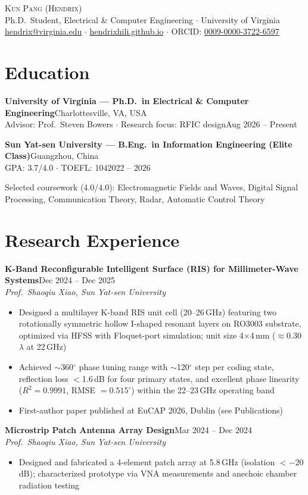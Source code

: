 \documentclass[letterpaper,10pt]{article}
\newcommand{\entry}[4]{%
  \textbf{#1}\hfill #2\\
  #3\hfill #4\par}
\newcommand{\gap}{\vspace{2pt}}
\begin{document}
\begin{center}
  {\LARGE\textsc{Kun Pang (Hendrix)}}\\[2pt]
  Ph.D.\ Student, Electrical \& Computer Engineering $\cdot$ University of Virginia\\[1pt]
  \href{mailto:hendrix@virginia.edu}{hendrix@virginia.edu} $\cdot$
  \href{https://hendrixhili.github.io}{hendrixhili.github.io} $\cdot$
  ORCID: \href{https://orcid.org/0009-0000-3722-6597}{0009-0000-3722-6597}
\end{center}
\vspace{-8pt}

\section{Education}
\entry{University of Virginia\textnormal{ --- Ph.D.\ in Electrical \& Computer Engineering}}{Charlottesville, VA, USA}
  {Advisor: Prof.\ Steven Bowers $\cdot$ Research focus: RFIC design}{Aug 2026 -- Present}
\gap
\entry{Sun Yat-sen University\textnormal{ --- B.Eng.\ in Information Engineering (Elite Class)}}{Guangzhou, China}
  {GPA: 3.7/4.0 $\cdot$ TOEFL: 104}{2022 -- 2026}
Selected coursework (4.0/4.0): Electromagnetic Fields and Waves, Digital Signal Processing, Communication Theory, Radar, Automatic Control Theory\par

\section{Research Experience}
\entry{K-Band Reconfigurable Intelligent Surface (RIS) for Millimeter-Wave Systems}{Dec 2024 -- Dec 2025}
  {\textit{Prof.\ Shaoqiu Xiao, Sun Yat-sen University}}{}
\begin{itemize}
  \item Designed a multilayer K-band RIS unit cell (20--26\,GHz) featuring two rotationally symmetric hollow I-shaped resonant layers on RO3003 substrate, optimized via HFSS with Floquet-port simulation; unit size 4$\times$4\,mm ($\approx$0.30$\lambda$ at 22\,GHz)
  \item Achieved $\sim$360$^\circ$ phase tuning range with $\sim$120$^\circ$ step per coding state, reflection loss $<$1.6\,dB for four primary states, and excellent phase linearity ($R^2 = 0.9991$, RMSE $= 0.515^\circ$) within the 22--23\,GHz operating band
  \item First-author paper published at EuCAP 2026, Dublin (see Publications)
\end{itemize}
\gap
\entry{Microstrip Patch Antenna Array Design}{Mar 2024 -- Dec 2024}
  {\textit{Prof.\ Shaoqiu Xiao, Sun Yat-sen University}}{}
\begin{itemize}
  \item Designed and fabricated a 4-element patch array at 5.8\,GHz (isolation $< -20$\,dB); characterized prototype via VNA measurements and anechoic chamber radiation testing
\end{itemize}
\end{document}
